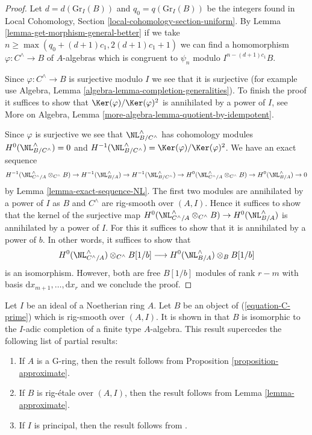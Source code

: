 \begin{proof}
\medskip\noindent
Let $d = d(\text{Gr}_I(B))$ and $q_0 = q(\text{Gr}_I(B))$ be the integers
found in 
Local Cohomology, Section \ref{local-cohomology-section-uniform}.
By Lemma \ref{lemma-get-morphism-general-better} if we take
$n \geq \max(q_0 + (d + 1)c_1, 2(d + 1)c_1 + 1)$ we can find a homomorphism
$\varphi : C^\wedge \to B$ of $A$-algebras which is congruent to
$\psi_n$ modulo $I^{n - (d + 1)c_1}B$.

\medskip\noindent
Since $\varphi : C^\wedge \to B$ is surjective modulo $I$
we see that it is surjective (for example use
Algebra, Lemma \ref{algebra-lemma-completion-generalities}).
To finish the proof it suffices to show that
$\Ker(\varphi)/\Ker(\varphi)^2$ is annihilated by a power of $I$, see
More on Algebra, Lemma \ref{more-algebra-lemma-quotient-by-idempotent}.

\medskip\noindent
Since $\varphi$ is surjective we see that
$\NL_{B/C^{\wedge}}^\wedge$ has cohomology modules
$H^0(\NL_{B/C^{\wedge}}^\wedge) = 0$ and
$H^{-1}(\NL_{B/C^{\wedge}}^\wedge) = \Ker(\varphi)/\Ker(\varphi)^2$.
We have an exact sequence
$$
H^{-1}(\NL_{C^\wedge/A}^\wedge \otimes_{C^\wedge} B) \to
H^{-1}(\NL_{B/A}^\wedge) \to
H^{-1}(\NL_{B/C^{\wedge}}^\wedge) \to
H^0(\NL_{C^\wedge/A}^\wedge \otimes_{C^\wedge} B) \to
H^0(\NL_{B/A}^\wedge) \to 0
$$
by Lemma \ref{lemma-exact-sequence-NL}. The first two modules are
annihilated by a power of $I$ as $B$ and $C^\wedge$ are rig-smooth over
$(A, I)$. Hence it suffices
to show that the kernel of the surjective map
$H^0(\NL_{C^\wedge/A}^\wedge \otimes_{C^\wedge} B) \to
H^0(\NL_{B/A}^\wedge)$ is annihilated by a power of $I$.
For this it suffices to show that it is annihilated by
a power of $b$. In other words, it suffices to show that
$$
H^0(\NL_{C^\wedge/A}^\wedge) \otimes_{C^\wedge} B[1/b]
\longrightarrow
H^0(\NL_{B/A}^\wedge) \otimes_B B[1/b]
$$
is an isomorphism. However, both are free $B[1/b]$ modules
of rank $r - m$ with basis $\text{d}x_{m + 1}, \ldots, \text{d}x_r$
and we conclude the proof.
\end{proof}

\begin{remark}
\label{remark-discussion}
Let $I$ be an ideal of a Noetherian ring $A$. Let $B$ be an object
of (\ref{equation-C-prime}) which is rig-smooth over $(A, I)$.
It is shown in \cite[Theorem 1.2]{gabber-zavyalov} that $B$ is
isomorphic to the $I$-adic completion of a finite type $A$-algebra.
This result supercedes the following list of partial results:
\begin{enumerate}
\item If $A$ is a G-ring, then the result follows from
Proposition \ref{proposition-approximate}.
\item If $B$ is rig-\'etale over $(A, I)$, then the result follows from
Lemma \ref{lemma-approximate}.
\item If $I$ is principal, then the result follows from
\cite[III Theorem 7]{Elkik}.
\end{enumerate}
\end{remark}







